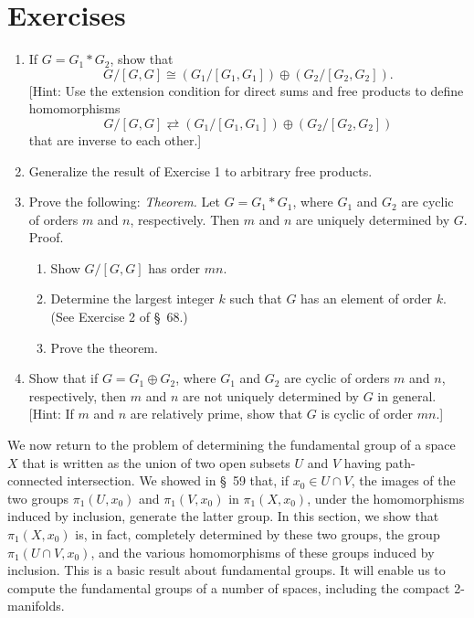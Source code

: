 \section*{Exercises}
\begin{enumerate}[itemsep=0.4em, parsep=0pt, topsep=0pt, partopsep=0pt, leftmargin=*, label=\arabic*., ref=\arabic*]
\item If \(G = G_{1} * G_{2}\), show that \[ G/[ {G,G}] \cong ( {G_{1}/[ {G_{1},G_{1}}] }) \oplus ( {G_{2}/[ {G_{2},G_{2}}] }). \] [Hint: Use the extension condition for direct sums and free products to define homomorphisms \[ G/[ {G,G}] \rightleftarrows ( {G_{1}/[ {G_{1},G_{1}}] }) \oplus ( {G_{2}/[ {G_{2},G_{2}}] }) \] that are inverse to each other.]
\item Generalize the result of Exercise 1 to arbitrary free products.
\item Prove the following: \textsl{Theorem.} Let \(G = G_{1} * G_{1}\), where \(G_{1}\) and \(G_{2}\) are cyclic of orders \(m\) and \(n\), respectively. Then \(m\) and \(n\) are uniquely determined by \(G\). Proof.
 \begin{enumerate}[itemsep=0.2em, parsep=0pt, topsep=0pt, partopsep=0pt, leftmargin=*, label=(\alph*), align=left]
 \item Show \(G/[ {G,G}]\) has order \({mn}\).
 \item Determine the largest integer \(k\) such that \(G\) has an element of order \(k\). (See Exercise 2 of \S\ 68.)
 \item Prove the theorem.
 \end{enumerate}
\item Show that if \(G = G_{1} \oplus {G}_{2}\), where \(G_{1}\) and \(G_{2}\) are cyclic of orders \(m\) and \(n\), respectively, then \(m\) and \(n\) are not uniquely determined by \(G\) in general. [Hint: If \(m\) and \(n\) are relatively prime, show that \(G\) is cyclic of order \({mn}\).]
\end{enumerate}

We now return to the problem of determining the fundamental group of a space \(X\) that is written as the union of two open subsets \(U\) and \(V\) having path-connected intersection. We showed in \S\ 59 that, if \(x_{0} \in U \cap V\), the images of the two groups \({\pi }_{1}( {U,x_{0}})\) and \({\pi }_{1}( {V,x_{0}})\) in \({\pi }_{1}( {X,x_{0}})\), under the homomorphisms induced by inclusion, generate the latter group. In this section, we show that \({\pi }_{1}( {X,x_{0}})\) is, in fact, completely determined by these two groups, the group \({\pi }_{1}( {U \cap V,x_{0}})\), and the various homomorphisms of these groups induced by inclusion. This is a basic result about fundamental groups. It will enable us to compute the fundamental groups of a number of spaces, including the compact 2-manifolds.

